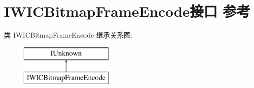 \hypertarget{interface_i_w_i_c_bitmap_frame_encode}{}\section{I\+W\+I\+C\+Bitmap\+Frame\+Encode接口 参考}
\label{interface_i_w_i_c_bitmap_frame_encode}
类 I\+W\+I\+C\+Bitmap\+Frame\+Encode 继承关系图\+:\begin{figure}[H]
\begin{center}
\leavevmode
\includegraphics[height=2.000000cm]{interface_i_w_i_c_bitmap_frame_encode}
\end{center}
\end{figure}
